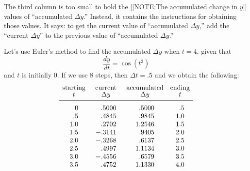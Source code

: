 The third column is too small to hold the 
[[NOTE:The accumulated change in $y$]]
values of ``accumulated $\Delta y$.''  Instead, it contains the
instructions for obtaining those values.  It says: to get the current
value of ``accumulated $\Delta y$,'' add the ``current $\Delta y$'' to
the previous value of ``accumulated $\Delta y$.''

Let's use Euler's method to find the accumulated $\Delta y$ when $t =
4$, given that\label{accum delta y}
\[
\dfrac{dy}{dt} = \cos(t^2) 
\]
and $t$ is initially 0.  If we use 8 steps, then $\Delta t = .5$ and
we obtain the following: 
\addtolength{\arraycolsep}{2pt} {\small
        \[
\begin{array}{cccc}
        \mbox{starting} & \mbox{current} & \mbox{accumulated} &
                \mbox{ending} \\ [-2pt]
        t & \Delta y &  \Delta y & t \\[2pt] \hline
        \begin{array}{r}
        \rule{0pt}{14pt} 0 \\ .5 \\ 1.0 \\ 1.5 \\ 2.0 \\ 2.5
                \\ 3.0 \\ 3.5
        \end{array}
        &
        \begin{array}{r}
        \rule{0pt}{14pt} .5000\\ .4845 \\ .2702 \\ -.3141
                \\ -.3268 \\ .4997 \\ -.4556 \\ .4752 
        \end{array}
        &
        \begin{array}{r}
        \rule{0pt}{14pt} .5000 \\ .9845 \\ 1.2546 \\ .9405 
                \\ .6137 \\ 1.1134 \\ .6579 \\ 1.1330
        \end{array}
        &
        \begin{array}{r}
        \rule{0pt}{14pt} .5 \\ 1.0 \\ 1.5 \\ 2.0 \\ 2.5
                \\ 3.0 \\ 3.5 \\ 4.0
        \end{array}
\end{array}
\]
}\addtolength{\arraycolsep}{-2pt}%
